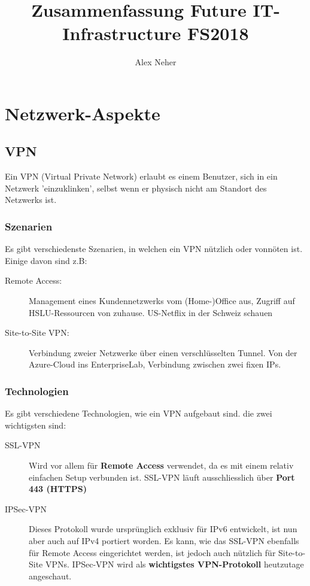 \documentclass[a4paper, 11pt]{article}
\begin{document}
	
\title{Zusammenfassung Future IT-Infrastructure FS2018}
\author{Alex Neher}
\maketitle

\tableofcontents
\newpage
\listoffigures
\newpage

\graphicspath{{./Pictures/}}

\section{Netzwerk-Aspekte}
\subsection{VPN}
Ein VPN (Virtual Private Network) erlaubt es einem Benutzer, sich in ein Netzwerk 'einzuklinken', selbst wenn er physisch nicht am Standort des Netzwerks ist.

\subsubsection{Szenarien}
Es gibt verschiedenste Szenarien, in welchen ein VPN nützlich oder vonnöten ist. Einige davon sind z.B:
\begin{description}
	\item [Remote Access: ] Management eines Kundennetzwerks vom (Home-)Office aus, Zugriff auf HSLU-Ressourcen von zuhause. US-Netflix in der Schweiz schauen
	\item[Site-to-Site VPN: ] Verbindung zweier Netzwerke über einen verschlüsselten Tunnel. Von der Azure-Cloud ins EnterpriseLab, Verbindung zwischen zwei fixen IPs.
\end{description}

\subsubsection{Technologien}
Es gibt verschiedene Technologien, wie ein VPN aufgebaut sind. die zwei wichtigsten sind:

\begin{description}
	\item[SSL-VPN] Wird vor allem für \textbf{Remote Access} verwendet, da es mit einem relativ einfachen Setup verbunden ist. SSL-VPN läuft ausschliesslich über \textbf{Port 443 (HTTPS)}
	\item[IPSec-VPN] Dieses Protokoll wurde ursprünglich exklusiv für IPv6 entwickelt, ist nun aber auch auf IPv4 portiert worden. Es kann, wie das SSL-VPN ebenfalls für Remote Access eingerichtet werden, ist jedoch auch nützlich für Site-to-Site VPNs. IPSec-VPN wird als \textbf{wichtigstes VPN-Protokoll} heutzutage angeschaut.
\end{description}
\end{document}
